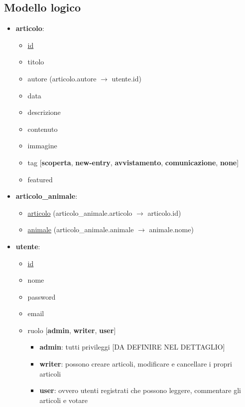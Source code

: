 \subsection{Modello logico}
    \begin{itemize}
        \item \textbf{articolo}:
        \begin{itemize}
            \item \underline{id} 
            \item titolo
            \item autore (articolo.autore $\rightarrow$ utente.id)
            \item data
            \item descrizione
            \item contenuto
            \item immagine
            \item tag [\textbf{scoperta}, \textbf{new-entry}, \textbf{avvistamento}, \textbf{comunicazione}, \textbf{none}]
            \item featured
        \end{itemize}

        \item \textbf{articolo\_animale}:
        \begin{itemize}
            \item \underline{articolo} (articolo\_animale.articolo $\rightarrow$ articolo.id)
            \item \underline{animale} (articolo\_animale.animale $\rightarrow$ animale.nome)
        \end{itemize}

        \item \textbf{utente}:
        \begin{itemize}
            \item \underline{id}
            \item nome
            \item password
            \item email
            \item ruolo [\textbf{admin}, \textbf{writer}, \textbf{user}]
            \begin{itemize}
                \item \textbf{admin}: tutti privileggi [DA DEFINIRE NEL DETTAGLIO]
                \item \textbf{writer}: possono creare articoli, modificare e cancellare i propri articoli
                \item \textbf{user}: ovvero utenti registrati che possono leggere, commentare gli articoli e votare
            \end{itemize}
        \end{itemize}


\end{itemize}
